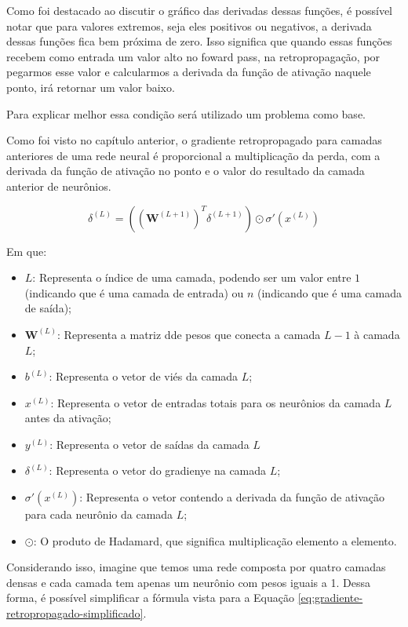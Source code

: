 Como foi destacado ao discutir o gráfico das derivadas dessas funções, é possível notar que para valores extremos, seja eles positivos ou negativos, a derivada dessas funções fica bem próxima de zero. Isso significa que quando essas funções recebem como entrada um valor alto no foward pass, na retropropagação, por pegarmos esse valor e calcularmos a derivada da função de ativação naquele ponto, irá retornar um valor baixo.

Para explicar melhor essa condição será utilizado um problema como base.

Como foi visto no capítulo anterior, o gradiente retropropagado para camadas anteriores de uma rede neural é proporcional a multiplicação da perda, com a derivada da função de ativação no ponto e o valor do resultado da camada anterior de neurônios. 

\[
    \delta^{(L)} = \left( \left( \textbf{W}^{(L+1)} \right)^T \delta^{(L+1)} \right)  \odot \sigma'(x^{(L)})
\]

Em que: 

\begin{itemize}
    \item $L$: Representa o índice de uma camada, podendo ser um valor entre $1$ (indicando que é uma camada de entrada) ou $n$ (indicando que é uma camada de saída);
    \item $\textbf{W}^{(L)}$: Representa a matriz dde pesos que conecta a camada $L - 1$ à camada $L$;
    \item $b^{(L)}$: Representa o vetor de viés da camada $L$;
    \item $x^{(L)}$: Representa o vetor de entradas totais para os neurônios da camada $L$ antes da ativação;
    \item $y^{(L)}$: Representa o vetor de saídas da camada $L$
    \item $\delta^{(L)}$: Representa o vetor do gradienye na camada $L$;
    \item $\sigma'(x^{(L)})$: Representa o vetor contendo a derivada da função de ativação para cada neurônio da camada $L$;
    \item $\odot$: O produto de Hadamard, que significa multiplicação elemento a elemento.
\end{itemize}

Considerando isso, imagine que temos uma rede composta por quatro camadas densas e cada camada tem apenas um neurônio com pesos iguais a 1. Dessa forma, é possível simplificar a fórmula vista para a Equação \ref{eq:gradiente-retropropagado-simplificado}.

